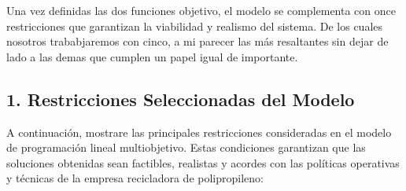 \documentclass[a4paper,12pt]{article}
\begin{document}
Una vez definidas las dos funciones objetivo, el modelo se complementa con once restricciones que garantizan la viabilidad y realismo del sistema. De los cuales nosotros trababjaremos con cinco, a mi parecer las más resaltantes sin dejar de lado a las demas que cumplen un papel igual de importante. 

\subsection*{1. Restricciones Seleccionadas del Modelo}

A continuación, mostrare las principales restricciones consideradas en el modelo de programación lineal multiobjetivo. Estas condiciones garantizan que las soluciones obtenidas sean factibles, realistas y acordes con las políticas operativas y técnicas de la empresa recicladora de polipropileno:
\end{document}
